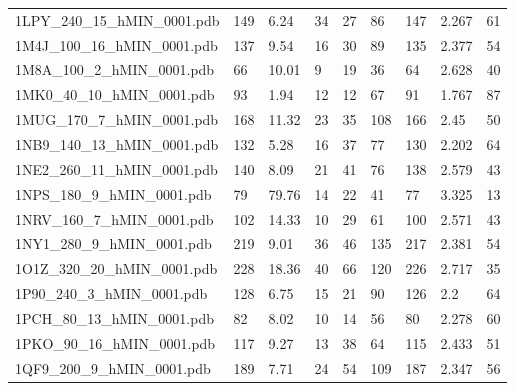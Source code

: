 \documentclass{bioinfo}
\begin{document}
\begin{table}[!t]
{\begin{tabular}{lllllllll}
    1LPY\_240\_15\_hMIN\_0001.pdb & 149      & 6.24       & 34          & 27          & 86          & 147     & 2.267           & 61           \\
    1M4J\_100\_16\_hMIN\_0001.pdb & 137      & 9.54       & 16          & 30          & 89          & 135     & 2.377           & 54           \\
    1M8A\_100\_2\_hMIN\_0001.pdb & 66       & 10.01      & 9           & 19          & 36          & 64      & 2.628           & 40           \\
    1MK0\_40\_10\_hMIN\_0001.pdb & 93       & 1.94       & 12          & 12          & 67          & 91      & 1.767           & 87           \\
    1MUG\_170\_7\_hMIN\_0001.pdb & 168      & 11.32      & 23          & 35          & 108         & 166     & 2.45            & 50           \\
    1NB9\_140\_13\_hMIN\_0001.pdb & 132      & 5.28       & 16          & 37          & 77          & 130     & 2.202           & 64           \\
    1NE2\_260\_11\_hMIN\_0001.pdb & 140      & 8.09       & 21          & 41          & 76          & 138     & 2.579           & 43           \\
    1NPS\_180\_9\_hMIN\_0001.pdb & 79       & 79.76      & 14          & 22          & 41          & 77      & 3.325           & 13           \\
    1NRV\_160\_7\_hMIN\_0001.pdb & 102      & 14.33      & 10          & 29          & 61          & 100     & 2.571           & 43           \\
    1NY1\_280\_9\_hMIN\_0001.pdb & 219      & 9.01       & 36          & 46          & 135         & 217     & 2.381           & 54           \\
    1O1Z\_320\_20\_hMIN\_0001.pdb & 228      & 18.36      & 40          & 66          & 120         & 226     & 2.717           & 35           \\
    1P90\_240\_3\_hMIN\_0001.pdb & 128      & 6.75       & 15          & 21          & 90          & 126     & 2.2             & 64           \\
    1PCH\_80\_13\_hMIN\_0001.pdb & 82       & 8.02       & 10          & 14          & 56          & 80      & 2.278           & 60           \\
    1PKO\_90\_16\_hMIN\_0001.pdb & 117      & 9.27       & 13          & 38          & 64          & 115     & 2.433           & 51           \\
    1QF9\_200\_9\_hMIN\_0001.pdb & 189      & 7.71       & 24          & 54          & 109         & 187     & 2.347           & 56           \\

\end{tabular}}
\end{table}
\end{document}
